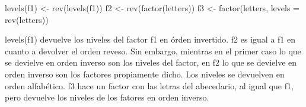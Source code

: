 \documentclass[
]{article}
\newenvironment{Shaded}{\begin{snugshade}}{\end{snugshade}}
\newcommand{\AttributeTok}[1]{\textcolor[rgb]{0.77,0.63,0.00}{#1}}
\newcommand{\FunctionTok}[1]{\textcolor[rgb]{0.00,0.00,0.00}{#1}}
\newcommand{\NormalTok}[1]{#1}
\newcommand{\OtherTok}[1]{\textcolor[rgb]{0.56,0.35,0.01}{#1}}
\begin{document}
\begin{Shaded}
\begin{Highlighting}[]
\FunctionTok{levels}\NormalTok{(f1) }\OtherTok{\textless{}{-}} \FunctionTok{rev}\NormalTok{(}\FunctionTok{levels}\NormalTok{(f1))}
\NormalTok{f2 }\OtherTok{\textless{}{-}} \FunctionTok{rev}\NormalTok{(}\FunctionTok{factor}\NormalTok{(letters))}
\NormalTok{f3 }\OtherTok{\textless{}{-}} \FunctionTok{factor}\NormalTok{(letters, }\AttributeTok{levels =} \FunctionTok{rev}\NormalTok{(letters)) }
\end{Highlighting}
\end{Shaded}

levels(f1) devuelve los niveles del factor f1 en órden invertido. f2 es
igual a f1 en cuanto a devolver el orden reveso. Sin embargo, mientras
en el primer caso lo que se devielve en orden inverso son los niveles
del factor, en f2 lo que se devielve en orden inverso son los factores
propiamente dicho. Los niveles se devuelven en orden alfabético. f3 hace
un factor con las letras del abecedario, al igual que f1, pero devuelve
los niveles de los fatores en orden inverso.
\end{document}

